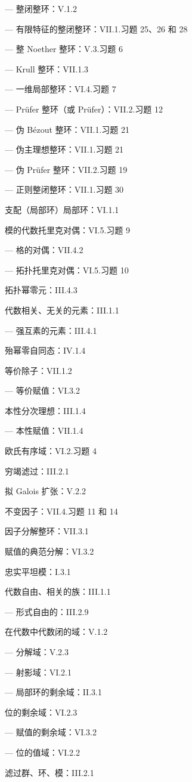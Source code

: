 --- 整闭整环：V.1.2

--- 有限特征的整闭整环：VII.1.习题 25、26 和 28

--- 整 Noether 整环：V.3.习题 6

--- Krull 整环：VII.1.3

--- 一维局部整环：VI.4.习题 7

--- Prüfer 整环（或 Prüfer）：VII.2.习题 12

--- 伪 Bézout 整环：VII.1.习题 21

--- 伪主理想整环：VII.1.习题 21

--- 伪 Prüfer 整环：VII.2.习题 19

--- 正则整闭整环：VII.1.习题 30

支配（局部环）局部环：VI.1.1

模的代数托里克对偶：VI.5.习题 9

--- 格的对偶：VII.4.2

--- 拓扑托里克对偶：VI.5.习题 10

拓扑幂零元：III.4.3

代数相关、无关的元素：III.1.1

--- 强互素的元素：III.4.1

殆幂零自同态：IV.1.4

等价除子：VII.1.2

--- 等价赋值：VI.3.2

本性分次理想：III.1.4

--- 本性赋值：VII.1.4

欧氏有序域：VI.2.习题 4

穷竭滤过：III.2.1

拟 Galois 扩张：V.2.2

不变因子：VII.4.习题 11 和 14

因子分解整环：VII.3.1

赋值的典范分解：VI.3.2

忠实平坦模：I.3.1

代数自由、相关的族：III.1.1

--- 形式自由的：III.2.9

在代数中代数闭的域：V.1.2

--- 分解域：V.2.3

--- 射影域：VI.2.1

--- 局部环的剩余域：II.3.1

位的剩余域：VI.2.3

--- 赋值的剩余域：VI.3.2

--- 位的值域：VI.2.2

滤过群、环、模：III.2.1

